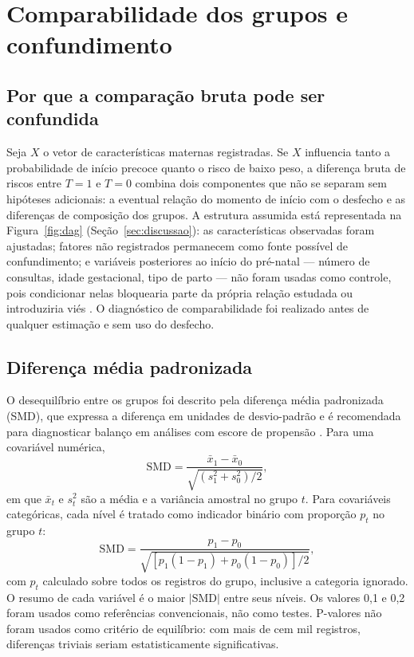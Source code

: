 \documentclass[11pt,a4paper]{article}
\begin{document}
\section{Comparabilidade dos grupos e confundimento}\label{sec:comparabilidade}

\subsection{Por que a comparação bruta pode ser confundida}

Seja $X$ o vetor de características maternas registradas. Se $X$ influencia tanto a
probabilidade de início precoce quanto o risco de baixo peso, a diferença bruta de riscos
entre $T=1$ e $T=0$ combina dois componentes que não se separam sem hipóteses adicionais:
a eventual relação do momento de início com o desfecho e as diferenças de composição dos
grupos. A estrutura assumida está representada na Figura~\ref{fig:dag}
(Seção~\ref{sec:discussao}): as características observadas foram ajustadas; fatores não
registrados permanecem como fonte possível de confundimento; e variáveis posteriores ao
início do pré-natal --- número de consultas, idade gestacional, tipo de parto --- não
foram usadas como controle, pois condicionar nelas bloquearia parte da própria relação
estudada ou introduziria viés \cite{schisterman2009,wilcox2011}. O diagnóstico de
comparabilidade foi realizado antes de qualquer estimação e sem uso do desfecho.

\subsection{Diferença média padronizada}

O desequilíbrio entre os grupos foi descrito pela diferença média padronizada (SMD), que
expressa a diferença em unidades de desvio-padrão e é recomendada para diagnosticar
balanço em análises com escore de propensão \cite{austin2015}. Para uma covariável
numérica,
\begin{equation}\label{eq:smd-num}
\mathrm{SMD} = \frac{\bar{x}_1 - \bar{x}_0}{\sqrt{\left(s_1^2 + s_0^2\right)/2}},
\end{equation}
em que $\bar{x}_t$ e $s_t^2$ são a média e a variância amostral no grupo $t$. Para
covariáveis categóricas, cada nível é tratado como indicador binário com proporção $p_t$
no grupo $t$:
\begin{equation}\label{eq:smd-cat}
\mathrm{SMD} = \frac{p_1 - p_0}{\sqrt{\left[p_1(1-p_1) + p_0(1-p_0)\right]/2}},
\end{equation}
com $p_t$ calculado sobre todos os registros do grupo, inclusive a categoria ignorado. O
resumo de cada variável é o maior $|\mathrm{SMD}|$ entre seus níveis. Os valores 0,1 e
0,2 foram usados como referências convencionais, não como testes. P-valores não foram
usados como critério de equilíbrio: com mais de cem mil registros, diferenças triviais
seriam estatisticamente significativas.
\end{document}
